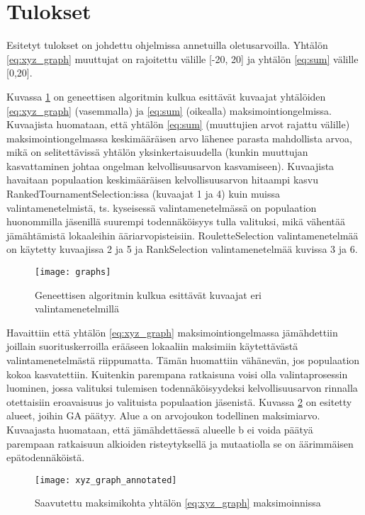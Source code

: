 \section{Tulokset}

Esitetyt tulokset on johdettu ohjelmissa annetuilla oletusarvoilla. Yhtälön \ref{eq:xyz_graph} muuttujat on rajoitettu välille [-20, 20] ja yhtälön
\ref{eq:sum} välille [0,20].

Kuvassa \ref{fig:graphs} on geneettisen algoritmin kulkua esittävät kuvaajat yhtälöiden \ref{eq:xyz_graph} (vasemmalla) ja \ref{eq:sum} (oikealla)
maksimointiongelmissa. Kuvaajista huomataan, että yhtälön \ref{eq:sum} (muuttujien arvot rajattu välille) maksimointiongelmassa keskimääräisen
arvo lähenee parasta mahdollista arvoa, mikä on selitettävissä yhtälön yksinkertaisuudella (kunkin muuttujan kasvattaminen
johtaa ongelman kelvollisuusarvon kasvamiseen). Kuvaajista havaitaan populaation keskimääräisen kelvollisuusarvon hitaampi kasvu RankedTournamentSelection:issa (kuvaajat 1 ja 4)
kuin muissa valintamenetelmistä, ts. kyseisessä valintamenetelmässä on populaation huonommilla jäsenillä suurempi todennäköisyys tulla valituksi, mikä
vähentää jämähtämistä lokaaleihin ääriarvopisteisiin. RouletteSelection valintamenetelmää on käytetty kuvaajissa 2 ja 5 ja RankSelection valintamenetelmää
kuvissa 3 ja 6.

\begin{figure}[H]
	\caption{Geneettisen algoritmin kulkua esittävät kuvaajat eri valintamenetelmillä}
	\centering
	\texttt{[image: graphs]}
	\label{fig:graphs}
\end{figure}

Havaittiin että yhtälön \ref{eq:xyz_graph} maksimointiongelmassa jämähdettiin joillain suorituskerroilla erääseen lokaaliin
maksimiin käytettävästä valintamenetelmästä riippumatta. Tämän huomattiin vähänevän, jos populaation kokoa kasvatettiin.
Kuitenkin parempana ratkaisuna voisi olla valintaprosessin luominen, jossa
valituksi tulemisen todennäköisyydeksi kelvollisuusarvon rinnalla otettaisiin eroavaisuus jo valituista populaation
jäsenistä. Kuvassa \ref{fig:xyz_graph_annotated} on esitetty alueet, joihin GA päätyy. Alue a on arvojoukon todellinen maksimiarvo.
Kuvaajasta huomataan, että jämähdettäessä alueelle b ei voida päätyä parempaan ratkaisuun alkioiden risteytyksellä ja mutaatiolla
se on äärimmäisen epätodennäköistä.

\begin{figure}[H]
	\caption{Saavutettu maksimikohta yhtälön \ref{eq:xyz_graph} maksimoinnissa}
	\centering
	\texttt{[image: xyz\_graph\_annotated]}
	\label{fig:xyz_graph_annotated}
\end{figure}
